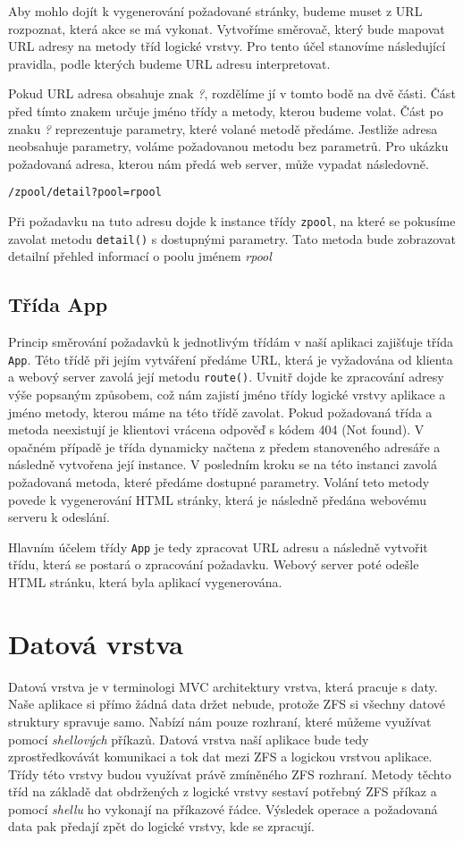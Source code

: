 Aby mohlo dojít k vygenerování požadované stránky, budeme muset z URL rozpoznat, která akce se má vykonat. Vytvoříme směrovač, který bude mapovat URL adresy na metody tříd logické vrstvy. Pro tento účel stanovíme následující pravidla, podle kterých budeme URL adresu interpretovat.

Pokud URL adresa obsahuje znak \emph{?}, rozdělíme jí v tomto bodě na dvě části. Část před tímto znakem určuje jméno třídy a metody, kterou budeme volat. Část po znaku \emph{?} reprezentuje parametry, které volané metodě předáme. Jestliže adresa neobsahuje parametry, voláme požadovanou metodu bez parametrů. Pro ukázku požadovaná adresa, kterou nám předá web server, může vypadat následovně.
\begin{verbatim}
/zpool/detail?pool=rpool
\end{verbatim}
Při požadavku na tuto adresu dojde k instance třídy \verb|zpool|, na které se pokusíme zavolat metodu \verb|detail()| s dostupnými parametry. Tato metoda bude zobrazovat detailní přehled informací o poolu jménem \emph{rpool}
    \subsection{Třída App}
    Princip směrování požadavků k jednotlivým třídám v naší aplikaci zajišťuje třída \verb|App|. Této třídě při jejím vytváření předáme URL, která je vyžadována od klienta a webový server zavolá její metodu \verb|route()|. Uvnitř dojde ke zpracování adresy výše popsaným způsobem, což nám zajistí jméno třídy logické vrstvy aplikace a jméno metody, kterou máme na této třídě zavolat. Pokud požadovaná třída a metoda neexistují je klientovi vrácena odpověď s kódem 404 (Not found). V opačném případě je třída dynamicky načtena z předem stanoveného adresáře a následně vytvořena její instance. V posledním kroku se na této instanci zavolá požadovaná metoda, které předáme dostupné parametry. Volání teto metody povede k vygenerování HTML stránky, která je následně předána webovému serveru k odeslání.

    Hlavním účelem třídy \verb|App| je tedy zpracovat URL adresu a následně vytvořit třídu, která se postará o zpracování požadavku. Webový server poté odešle HTML stránku, která byla aplikací vygenerována.

\section{Datová vrstva}
Datová vrstva je v terminologi MVC architektury vrstva, která pracuje s daty. Naše aplikace si přímo žádná data držet nebude, protože ZFS si všechny datové struktury spravuje samo. Nabízí nám pouze rozhraní, které můžeme využívat pomocí \emph{shellových} příkazů. Datová vrstva naší aplikace bude tedy zprostředkovávát komunikaci a tok dat mezi ZFS a logickou vrstvou aplikace. Třídy této vrstvy budou využívat právě zmíněného ZFS rozhraní. Metody těchto tříd na základě dat obdržených z logické vrstvy sestaví potřebný ZFS příkaz a pomocí \emph{shellu} ho vykonají na příkazové řádce. Výsledek operace a požadovaná data pak předají zpět do logické vrstvy, kde se zpracují.

